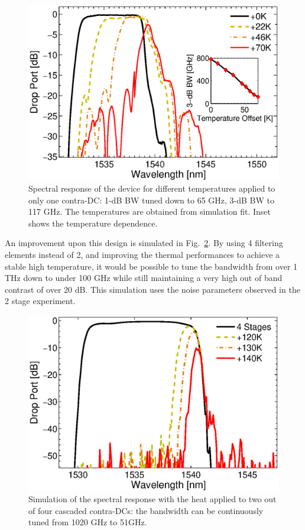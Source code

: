 \documentclass[9pt,twocolumn,twoside]{osajnl}
\begin{document}
\begin{figure}[htbp]
\centering
\includegraphics[width=.99\columnwidth]{data/Band6}
\caption{Spectral response of the device for different temperatures applied to only one contra-DC: 1-dB BW tuned down to 65 GHz, 3-dB BW to 117 GHz. The temperatures are obtained from simulation fit. Inset shows the temperature dependence.}
\label{fig:bandTune}
\end{figure} 
An improvement upon this design is simulated in Fig.~\ref{fig:bandTuneSimu}. By using 4 filtering elements instead of 2, and improving the thermal performances to achieve a stable high temperature, it would be possible to tune the bandwidth from over 1 THz down to under 100 GHz while still maintaining a very high out of band contrast of over 20 dB. This simulation uses the noise parameters observed in the 2 stage experiment.
\begin{figure}[htbp]
\centering
\includegraphics[width=.99\columnwidth]{data/4StageDesignCompiled}
\caption{Simulation of the spectral response with the heat applied to two out of four cascaded contra-DCs: the bandwidth can be continuously tuned from 1020 GHz to  51GHz.}
\label{fig:bandTuneSimu}
\end{figure} 
\end{document}
